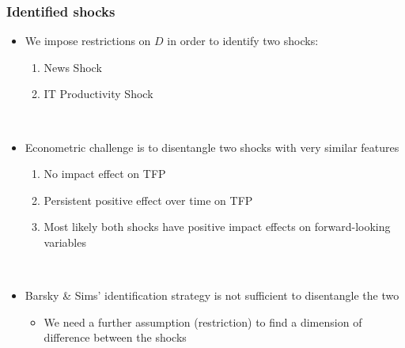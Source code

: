 \documentclass{beamer}
\begin{document}
\begin{frame}
\frametitle{Identified shocks}


\begin{itemize}
	\item We impose restrictions on $D$ in order to identify two shocks:
	\begin{enumerate}
		\item News Shock
		\item IT Productivity Shock
	\end{enumerate}

\
	
	\item Econometric challenge is to disentangle two shocks with very similar features 
		\begin{enumerate}
		\item No impact effect on TFP
		\item Persistent positive effect over time on TFP
		\item Most likely both shocks have positive impact effects on forward-looking variables
	\end{enumerate}

\
	
	
	\item Barsky \& Sims' identification strategy is not sufficient to disentangle the two
	\begin{itemize}
		\item We need a further assumption (restriction) to find a dimension of difference between the shocks
	\end{itemize}
\end{itemize}


\end{frame}
\end{document}
